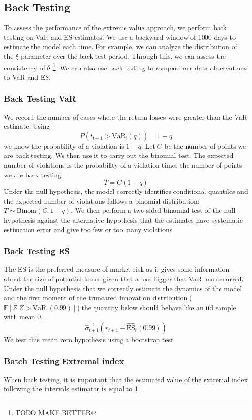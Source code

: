 \documentclass{article}
\theoremstyle{definition}
\theoremstyle{definition}
\def\E{\mathbb{E}}
\begin{document}
\subsection{Back Testing}
To assess the performance of the extreme value approach, we perform back testing on VaR and ES estimates. We use a backward window of 1000 days to estimate the model each time. For example, we can analyze the distribution of the $\xi$ parameter over the back test period. Through this, we can assess the consistency of $\theta$ \footnote{TODO MAKE BETTER}. We can also use back testing to compare our data observations to VaR and ES. 
\subsubsection{Back Testing VaR}
We record the number of cases where the return losses were greater than the VaR estimate. Using 
\[P(t_{t+1}>\text{VaR}_t(q))= 1-q\]
we know the probability of a violation is $1-q$. Let $C$ be the number of points we are back testing. We then use it to carry out the binomial test. The expected number of violations is the probability of a violation times the number of points we are back testing
\[T=C(1-q)\]
Under the null hypothesis, the model correctly identifies conditional quantiles and the expected number of violations follows a binomial distribution: $T\sim \text{Binom}(C, 1-q)$. We then perform a two sided binomial test of the null hypothesis against the alternative hypothesis that the estimates have systematic estimation error and give too few or too many violations.
\subsubsection{Back Testing ES}
The ES is the preferred measure of market risk as it gives some information about the size of potential losses given that a loss bigger that VaR has occurred. Under the null hypothesis that we correctly estimate the dynamics of the model and the first moment of the truncated innovation distribution ($\E[Z|Z>\text{VaR}_t(0.99)]$) the quantity below should behave like an iid sample with mean 0.
\[\hat\sigma_{t+1}^{-1}(r_{t+1} - \widehat{\text{ES}}_t(0.99))\]
We test this mean zero hypothesis using a bootstrap test.
\subsubsection{Batch Testing Extremal index}
When back testing, it is important that the estimated value of the extremal index following the intervals estimator is equal to 1.
\end{document}
